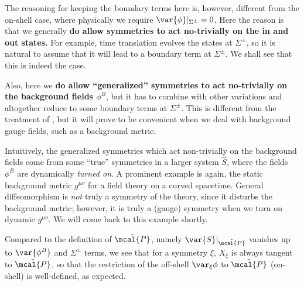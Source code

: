 \documentclass[a4paper
	,10pt
]{article}
\begin{document}
	The reasoning for keeping the boundary terms here is, however, different from the on-shell case, where physically we require $\var{\phi}|_{\Sigma^\pm} = 0$. Here the reason is that we generally \textbf{do allow symmetries to act no-trivially on the in and out states.} For example, time translation evolves the states at $\Sigma^\pm$, so it is natural to assume that it will lead to a boundary term at $\Sigma^\pm$. We shall see that this is indeed the case.
	
	Also, here we \textbf{do allow ``generalized'' symmetries to act no-trivially on the background fields $\phi^B$}, but it has to combine with other variations and altogether reduce to some boundary terms at $\Sigma^\pm$. This is different from the treatment of \textcite{Banados:2016zim}, but it will prove to be convenient when we deal with background gauge fields, such as a background metric. 
	
	Intuitively, the generalized symmetries which act non-trivially on the background fields come from some ``true'' symmetries in a larger system $\hat{S}$, where the fields $\phi^B$ are dynamically \textit{turned on}. A prominent example is again, the static background metric $g^{\mu\nu}$ for a field theory on a curved spacetime. General diffeomorphism is \textit{not} truly a symmetry of the theory, since it disturbs the background metric; however, it is truly a (gauge) symmetry when we turn on dynamic $g^{\mu\nu}$. We will come back to this example shortly. 
	
	\newparagraph
	Compared to the definition of $\tilde{\mcal{P}}$, namely $\var{S}|_{\tilde{\mcal{P}}}$ vanishes up to $\var{\phi^B}$ and $\Sigma^\pm$ terms, we see that for a symmetry $\xi$, $X_\xi$ is always tangent to $\tilde{\mcal{P}}$, so that the restriction of the off-shell $\var_\xi \phi$ to $\tilde{\mcal{P}}$ (on-shell) is well-defined, as expected. 
	
\pagebreak
	
\end{document}
